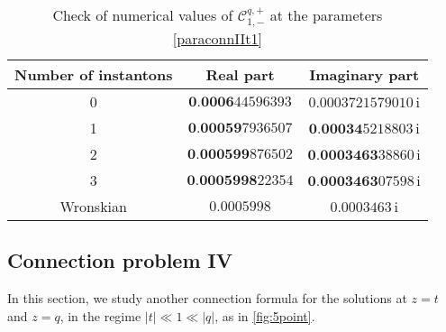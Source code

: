 \documentclass[11pt]{article}
\numberwithin{equation}{section}
\begin{document}
\begin{table}[h]
\centering
 \begin{tabular}{| c | c  c| }
    \hline
     Number of instantons & Real part  & Imaginary part  \\

    \hline   

    0  & $\textbf{0.0006}44596393$  & $\textbf{}0.0003721579010$\,i  \\
        
    1  & $\textbf{0.00059}7936507$  & $\textbf{0.00034}5218803$\,i  \\

    2  & $\textbf{0.000599}876502$  & $\textbf{0.0003463}38860 $\,i \\
    
    3  & $\textbf{0.0005998}22354$  & $\textbf{0.0003463}07598 $\,i \\
         \hline
    Wronskian & $0.0005998$  &  $0.0003463$\,i \\
        \hline
    \end{tabular}
    \caption{Check of numerical values of $\mathcal{C}_{1,-}^{q,+}$ at the parameters \eqref{paraconnIIt1}}
        \label{1toq2}
\end{table}

\subsection{Connection problem IV}\label{sec:connIV}

In this section, we study another connection formula for the solutions at $z=t$ and $z=q$, in the regime $|t|\ll 1 \ll |q|$, as in \autoref{fig:5point}.
\end{document}
